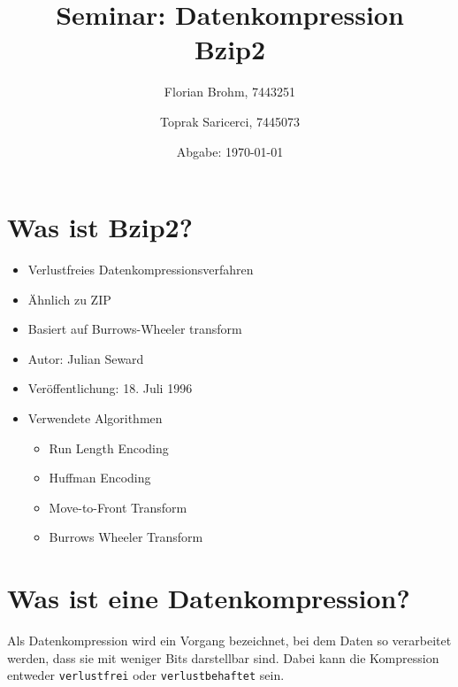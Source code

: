 \documentclass{article}
\date{Abgabe: \today}
\author{Florian Brohm, 7443251 \and Toprak Saricerci, 7445073}
\title{Seminar: Datenkompression\\Bzip2}
\begin{document}
\maketitle
\newpage

{
    \hypersetup{linkcolor=blue}
    \tableofcontents
}
\listoffigures
\newpage
\section{Was ist Bzip2?}
\begin{itemize}
    \item Verlustfreies Datenkompressionsverfahren
    \item Ähnlich zu ZIP
    \item Basiert auf Burrows-Wheeler transform
    \item Autor: Julian Seward
    \item Veröffentlichung: 18. Juli 1996
    \item Verwendete Algorithmen \begin{itemize}
        \item Run Length Encoding
        \item Huffman Encoding
        \item Move-to-Front Transform
        \item Burrows Wheeler Transform
    \end{itemize}
\end{itemize}
\vspace*{3cm}
\section{Was ist eine Datenkompression?}
Als Datenkompression wird ein Vorgang bezeichnet, bei dem Daten so verarbeitet werden, 
dass sie mit weniger Bits darstellbar sind. Dabei kann die Kompression entweder 
\texttt{verlustfrei} oder \texttt{verlustbehaftet} sein.
\end{document}
